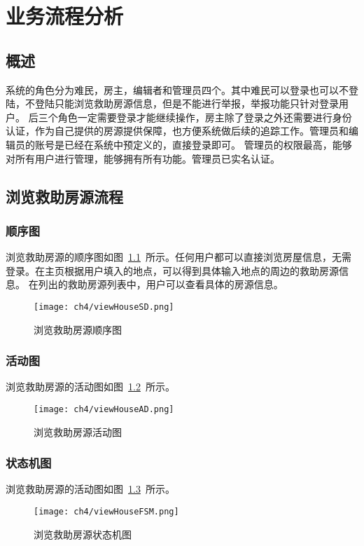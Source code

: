 \chapter{业务流程分析}

\section{概述}
系统的角色分为难民，房主，编辑者和管理员四个。其中难民可以登录也可以不登陆，不登陆只能浏览救助房源信息，但是不能进行举报，举报功能只针对登录用户。
后三个角色一定需要登录才能继续操作，房主除了登录之外还需要进行身份认证，作为自己提供的房源提供保障，也方便系统做后续的追踪工作。管理员和编辑员的账号是已经在系统中预定义的，直接登录即可。
管理员的权限最高，能够对所有用户进行管理，能够拥有所有功能。管理员已实名认证。


\section{浏览救助房源流程}
\subsection{顺序图}
浏览救助房源的顺序图如图~\ref{fig:viewHouseSD}~所示。任何用户都可以直接浏览房屋信息，无需登录。在主页根据用户填入的地点，可以得到具体输入地点的周边的救助房源信息。
在列出的救助房源列表中，用户可以查看具体的房源信息。
\begin{figure}[htbp]
    \centering
    \texttt{[image: ch4/viewHouseSD.png]}
    \caption{浏览救助房源顺序图}\label{fig:viewHouseSD}
    \vspace{\baselineskip} %
\end{figure}
\subsection{活动图}
浏览救助房源的活动图如图~\ref{fig:viewHouseAD}~所示。
\begin{figure}[htbp]
    \centering
    \texttt{[image: ch4/viewHouseAD.png]}
    \caption{浏览救助房源活动图}\label{fig:viewHouseAD}
    \vspace{\baselineskip} %
\end{figure}
\newpage
\subsection{状态机图}
浏览救助房源的活动图如图~\ref{fig:viewHouseFSM}~所示。
\begin{figure}[htbp]
    \centering
    \texttt{[image: ch4/viewHouseFSM.png]}
    \caption{浏览救助房源状态机图}\label{fig:viewHouseFSM}
    \vspace{\baselineskip} %
\end{figure}

